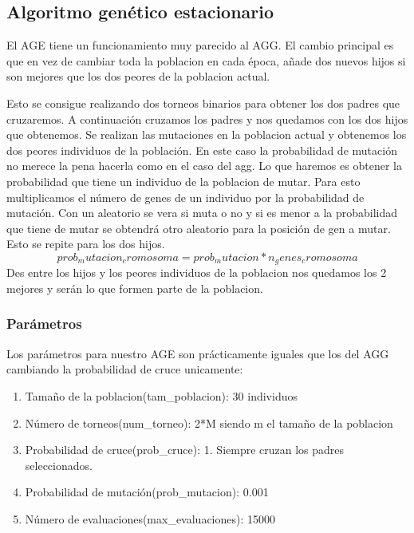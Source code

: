 \documentclass[titlepage]{article}
\begin{document}
	\subsection{Algoritmo genético estacionario}
	El AGE tiene un funcionamiento muy parecido al AGG. El cambio principal es que en vez de cambiar toda la poblacion en cada época, añade dos nuevos hijos si son mejores que los dos peores de la poblacion actual.
	
	Esto se consigue realizando dos torneos binarios para obtener los dos padres que cruzaremos. A continuación cruzamos los padres y nos quedamos con los dos hijos que obtenemos. Se realizan las mutaciones en la poblacion actual y obtenemos los dos peores individuos de la población. En este caso la probabilidad de mutación no merece la pena hacerla como en el caso del agg. Lo que haremos es obtener la probabilidad que tiene un individuo de la poblacion de mutar. Para esto multiplicamos el número de genes de un individuo por la probabilidad de mutación. Con un aleatorio se vera si muta o no y si es menor a la probabilidad que tiene de mutar se obtendrá otro aleatorio para la posición de gen a mutar. Esto se repite para los dos hijos.
	$$
	prob_mutacion_cromosoma = prob_mutacion * n_genes_cromosoma
	$$
	Des entre los hijos y los peores individuos de la poblacion nos quedamos los 2 mejores y serán lo que formen parte de la poblacion.
	\subsubsection{Parámetros}
	Los parámetros para nuestro AGE son prácticamente iguales que los del AGG cambiando la probabilidad de cruce unicamente:
	\begin{enumerate}
		\item Tamaño de la poblacion(tam\_poblacion): 30 individuos
		\item Número de torneos(num\_torneo): 2*M siendo m el tamaño de la poblacion
		\item Probabilidad de cruce(prob\_cruce): 1. Siempre cruzan los padres seleccionados.
		\item Probabilidad de mutación(prob\_mutacion): 0.001
		\item Número de evaluaciones(max\_evaluaciones): 15000
	\end{enumerate}
	\newpage
\end{document}
